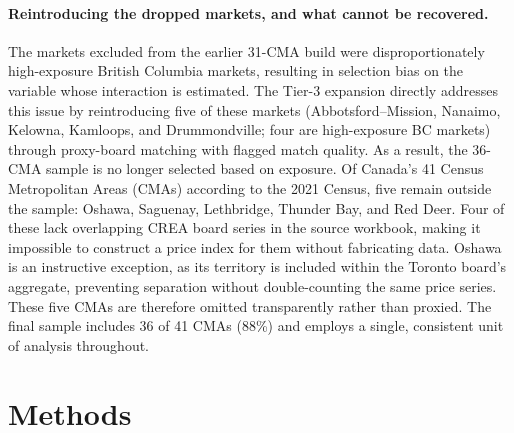 \documentclass[12pt]{article}
\begin{document}
\paragraph{Reintroducing the dropped markets, and what cannot be recovered.} The markets excluded from the earlier 31-CMA build were disproportionately high-exposure British Columbia markets, resulting in selection bias on the variable whose interaction is estimated. The Tier-3 expansion directly addresses this issue by reintroducing five of these markets (Abbotsford--Mission, Nanaimo, Kelowna, Kamloops, and Drummondville; four are high-exposure BC markets) through proxy-board matching with flagged match quality. As a result, the 36-CMA sample is no longer selected based on exposure. Of Canada's 41 Census Metropolitan Areas (CMAs) according to the 2021 Census, five remain outside the sample: Oshawa, Saguenay, Lethbridge, Thunder Bay, and Red Deer. Four of these lack overlapping CREA board series in the source workbook, making it impossible to construct a price index for them without fabricating data. Oshawa is an instructive exception, as its territory is included within the Toronto board's aggregate, preventing separation without double-counting the same price series. These five CMAs are therefore omitted transparently rather than proxied. The final sample includes 36 of 41 CMAs (88\%) and employs a single, consistent unit of analysis throughout.



\section{Methods}
\label{sec:methods}
\end{document}
